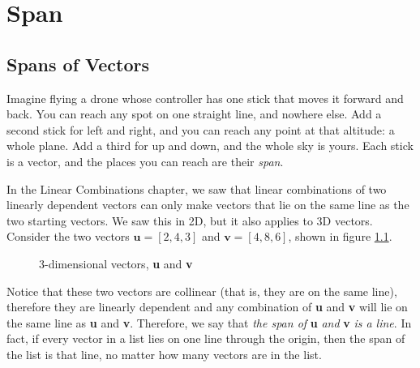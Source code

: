 \chapter{Span}
\section{Spans of Vectors}
Imagine flying a drone whose controller has one stick that moves it
forward and back. You can reach any spot on one straight line, and nowhere
else. Add a second stick for left and right, and you can reach any point
at that altitude: a whole plane. Add a third for up and down, and the
whole sky is yours. Each stick is a vector, and the places you can reach
are their \emph{span}.

In the Linear Combinations chapter, we saw that linear combinations of 
two linearly dependent vectors can only make vectors that lie on the same line 
as the two starting vectors. We saw this in 2D, but it also applies to 3D 
vectors. Consider the two vectors $\mathbf{u} = \left[ 2, 4, 3 \right]$ and 
$\mathbf{v} = \left[ 4, 8, 6 \right]$, shown in figure \ref{fig:3d_vectors-span}. 

\begin{figure}[H]
\centering
{} 
\caption{3-dimensional vectors, \textbf{u} and \textbf{v}}
\label{fig:3d_vectors-span}
\end{figure}
Notice that these two vectors are collinear (that is, they are on the same 
line), therefore they are linearly dependent and any combination of \textbf{u} 
and \textbf{v} will lie on the same line as \textbf{u} and \textbf{v}. 
Therefore, we say that \textit{the span of} \textbf{u} \textit{and} \textbf{v} \textit{is a line}. In fact, if every vector in a list lies on one line through the origin, then the span of the list is that line, no matter how many vectors are in the list. 

